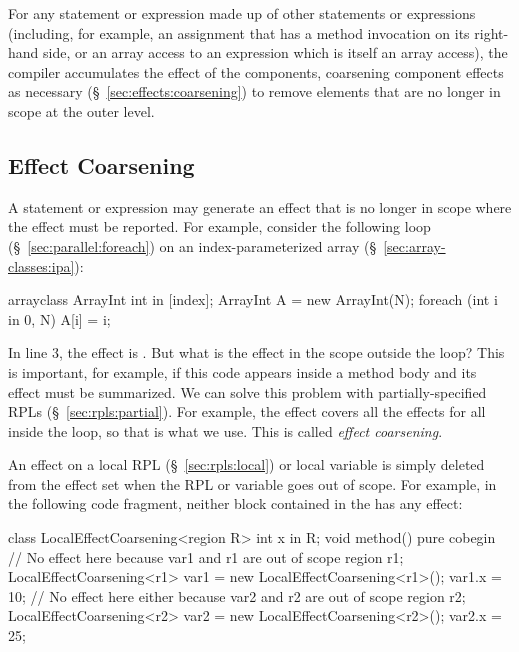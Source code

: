  For any statement or
expression made up of other statements or expressions (including, for
example, an assignment that has a method invocation on its right-hand
side, or an array access to an expression which is itself an array
access), the compiler accumulates the effect of the components,
coarsening component effects as necessary
(\S~\ref{sec:effects:coarsening}) to remove elements that are no
longer in scope at the outer level.



\subsection{Effect Coarsening%
\label{sec:effects:coarsening}}

A statement or expression may generate an effect that is no longer in
scope where the effect must be reported.  For example, consider the
following  loop (\S~\ref{sec:parallel:foreach}) on an
index-parameterized array (\S~\ref{sec:array-classes:ipa}):
%
\begin{numbereddpjlisting}
arrayclass ArrayInt { int in [index]; }
ArrayInt A = new ArrayInt(N);
foreach (int i in 0, N) {
  A[i] = i;
}
\end{numbereddpjlisting}
%
In line 3, the effect is .  But what is the effect in
the scope outside the loop?  This is important, for example, if this
code appears inside a method body and its effect must be summarized.
We can solve this problem with partially-specified RPLs
(\S~\ref{sec:rpls:partial}).  For example, the effect 
covers all the effects  for all  inside the
loop, so that is what we use.  This is called \emph{effect
  coarsening}.

 An effect on a local RPL
(\S~\ref{sec:rpls:local}) or local variable is simply deleted from the
effect set when the RPL or variable goes out of scope.  For example,
in the following code fragment, neither block contained in the
 has any effect:
%
\begin{dpjlisting}
class LocalEffectCoarsening<region R> {
  int x in R;
  void method() 
    pure 
  {
    cobegin {
      // No effect here because var1 and r1 are out of scope
      {
        region r1;
        LocalEffectCoarsening<r1> var1 = 
          new LocalEffectCoarsening<r1>();
        var1.x = 10;
      }
      // No effect here either because var2 and r2 are out of scope
      {
        region r2;
        LocalEffectCoarsening<r2> var2 =
          new LocalEffectCoarsening<r2>();
        var2.x = 25;
      }
    }
  }    
}
\end{dpjlisting}

